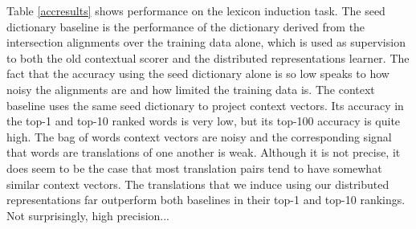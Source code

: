 \documentclass[11pt,letterpaper]{article}
\begin{document}


Table \ref{accresults} shows performance on the lexicon induction task. 
The seed dictionary baseline is the performance of the dictionary derived from the intersection alignments over the training data alone, which is used as supervision to both the old contextual scorer and the distributed representations learner.
The fact that the accuracy using the seed dictionary alone is so low speaks to how noisy the alignments are and how limited the training data is.
The context baseline uses the same seed dictionary to project context vectors.
Its accuracy in the top-1 and top-10 ranked words is very low, but its top-100 accuracy is quite high. 
The bag of words context vectors are noisy and the corresponding signal that words are translations of one another is weak. 
Although it is not precise, it does seem to be the case that most translation pairs tend to have somewhat similar context vectors.
The translations that we induce using our distributed representations far outperform both baselines in their top-1 and top-10 rankings. 
Not surprisingly, high precision... 
\end{document}
